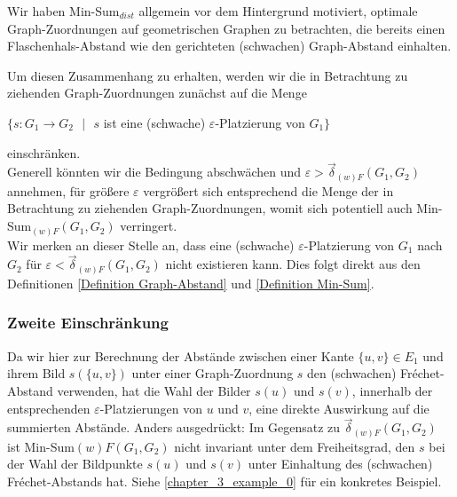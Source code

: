 \documentclass[a4paper, 12pt, twoside]{article}
\theoremstyle{Format1} %
\begin{document}
Wir haben Min-Sum$_{dist}$ allgemein vor dem Hintergrund motiviert, optimale Graph-Zuordnungen auf geometrischen Graphen zu betrachten,
die bereits einen Flaschenhals-Abstand wie den gerichteten (schwachen) Graph-Abstand einhalten.

Um diesen Zusammenhang zu erhalten, werden wir die in Betrachtung zu ziehenden Graph-Zuordnungen zunächst auf die Menge
\begin{center}
	$\{s: G_1 \to G_2 \text{ $|$ } s$ ist eine (schwache) $\varepsilon$-Platzierung von $G_1 \}$
\end{center}
einschränken.
\\
Generell könnten wir die Bedingung abschwächen und $\varepsilon > \vec{\delta}_{(w)F}(G_1, G_2)$ annehmen, für größere $\varepsilon$ vergrößert
sich entsprechend die Menge der in Betrachtung zu ziehenden Graph-Zuordnungen, womit sich potentiell auch Min-Sum$_{(w)F}(G_1, G_2)$ verringert.
\\
Wir merken an dieser Stelle an, dass eine (schwache) $\varepsilon$-Platzierung von $G_1$ nach $G_2$ für $\varepsilon < \vec{\delta}_{(w)F}(G_1,G_2)$
nicht existieren kann. Dies folgt direkt aus den Definitionen \ref{Definition Graph-Abstand} und \ref{Definition Min-Sum}.

\subsubsection{Zweite Einschränkung} \label {Zweite Einschränkung}
Da wir hier zur Berechnung der Abstände zwischen einer Kante $\{u,v\} \in E_1$ und ihrem Bild $s(\{u,v\})$ unter einer Graph-Zuordnung $s$ den (schwachen) Fréchet-Abstand verwenden,
hat die Wahl der Bilder $s(u)$ und $s(v)$, innerhalb der entsprechenden $\varepsilon$-Platzierungen von $u$ und $v$, eine direkte Auswirkung auf die summierten Abstände.
Anders ausgedrückt: Im Gegensatz zu $\vec{\delta}_{(w)F}(G_1,G_2)$ ist Min-Sum${(w)F}(G_1,G_2)$ nicht invariant unter dem Freiheitsgrad, den $s$
bei der Wahl der Bildpunkte $s(u)$ und $s(v)$ unter Einhaltung des (schwachen) Fréchet-Abstands hat. Siehe \ref{chapter_3_example_0} für ein konkretes Beispiel.
\end{document}
